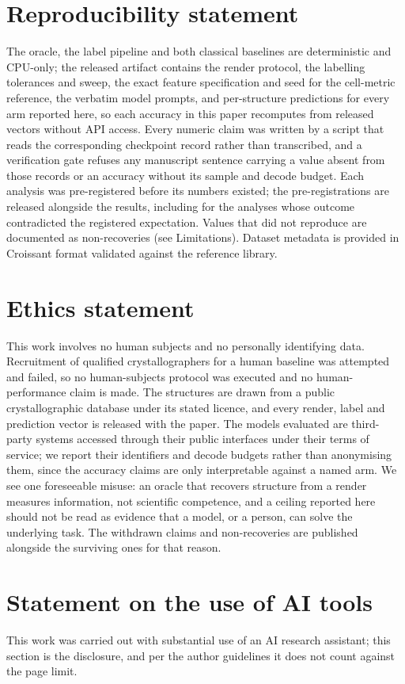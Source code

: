 \section*{Reproducibility statement}
The oracle, the label pipeline and both classical baselines are deterministic and CPU-only; the released
artifact contains the render protocol, the labelling tolerances and sweep, the exact feature specification
and seed for the cell-metric reference, the verbatim model prompts, and per-structure predictions for every
arm reported here, so each accuracy in this paper recomputes from released vectors without API access.
Every numeric claim was written by a script that reads the corresponding checkpoint record rather than
transcribed, and a verification gate refuses any manuscript sentence carrying a value absent from those
records or an accuracy without its sample and decode budget. Each analysis was pre-registered before its
numbers existed; the pre-registrations are released alongside the results, including for the analyses whose
outcome contradicted the registered expectation. Values that did not reproduce are documented as
non-recoveries (see Limitations). Dataset metadata is provided in Croissant format validated against the
reference library.

\section*{Ethics statement}
This work involves no human subjects and no personally identifying data. Recruitment of qualified
crystallographers for a human baseline was attempted and failed, so no human-subjects protocol was
executed and no human-performance claim is made. The structures are drawn from a public
crystallographic database under its stated licence, and every render, label and prediction vector is
released with the paper. The models evaluated are third-party systems accessed through their public
interfaces under their terms of service; we report their identifiers and decode budgets rather than
anonymising them, since the accuracy claims are only interpretable against a named arm. We see one
foreseeable misuse: an oracle that recovers structure from a render measures information, not
scientific competence, and a ceiling reported here should not be read as evidence that a model, or a
person, can solve the underlying task. The withdrawn claims and non-recoveries are published
alongside the surviving ones for that reason.

\section*{Statement on the use of AI tools}
This work was carried out with substantial use of an AI research assistant; this section is the disclosure,
and per the author guidelines it does not count against the page limit.

